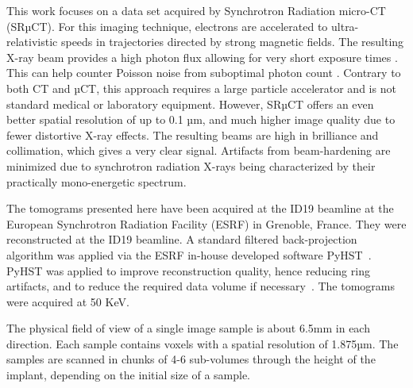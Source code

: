 This work focuses on a data set acquired by Synchrotron Radiation micro-CT
(SRµCT). For this imaging technique, electrons are accelerated to
ultra-relativistic speeds in trajectories directed by strong magnetic fields.
The resulting X-ray beam provides a high photon flux allowing for very short
exposure times \citep{srexptime}. This can help counter Poisson noise from
suboptimal photon count \citep{srnoise}. Contrary to both CT and µCT, this
approach requires a large particle accelerator and is not standard medical or
laboratory equipment. However, SRµCT offers an even better spatial resolution
of up to 0.1 µm, and much higher image quality due to fewer distortive X-ray
effects. The resulting beams are high in brilliance and collimation, which
gives a very clear signal. Artifacts from beam-hardening are minimized due to
synchrotron radiation X-rays being characterized by their practically
mono-energetic spectrum.

The tomograms presented here have been acquired at the ID19 beamline at the
European Synchrotron Radiation Facility (ESRF) in Grenoble, France. They were
reconstructed\citep{sporring} at the ID19 beamline. A standard filtered
back-projection algorithm was applied via the ESRF in-house developed software
PyHST~\citep{NELDAM2015682,pyhst}. PyHST was applied to improve reconstruction
quality, hence reducing ring artifacts, and to reduce the required data volume
if necessary~\cite{MIRONE201441}. The tomograms were acquired at 50 KeV.

The physical field of view of a single image sample is about 6.5mm in each
direction. Each sample contains voxels with a spatial resolution of 1.875µm.
The samples are scanned in chunks of 4-6 sub-volumes through the height of the
implant, depending on the initial size of a sample.


